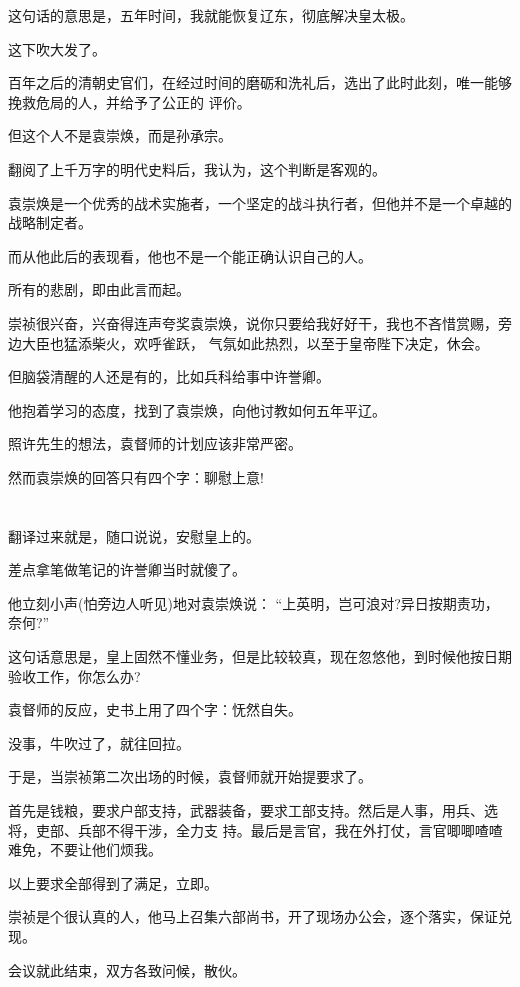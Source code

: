 \documentclass[11pt,a4paper,onecolumn]{article}
\begin{document}
这句话的意思是，五年时间，我就能恢复辽东，彻底解决皇太极。

这下吹大发了。

百年之后的清朝史官们，在经过时间的磨砺和洗礼后，选出了此时此刻，唯一能够挽救危局的人，并给予了公正的
评价。

但这个人不是袁崇焕，而是孙承宗。

翻阅了上千万字的明代史料后，我认为，这个判断是客观的。

袁崇焕是一个优秀的战术实施者，一个坚定的战斗执行者，但他并不是一个卓越的战略制定者。

而从他此后的表现看，他也不是一个能正确认识自己的人。

所有的悲剧，即由此言而起。

崇祯很兴奋，兴奋得连声夸奖袁崇焕，说你只要给我好好干，我也不吝惜赏赐，旁边大臣也猛添柴火，欢呼雀跃，
气氛如此热烈，以至于皇帝陛下决定，休会。

但脑袋清醒的人还是有的，比如兵科给事中许誉卿。

他抱着学习的态度，找到了袁崇焕，向他讨教如何五年平辽。

照许先生的想法，袁督师的计划应该非常严密。

然而袁崇焕的回答只有四个字：聊慰上意!

\section[\thesection]{}

翻译过来就是，随口说说，安慰皇上的。

差点拿笔做笔记的许誉卿当时就傻了。

他立刻小声(怕旁边人听见)地对袁崇焕说： ``上英明，岂可浪对?异日按期责功，奈何?''

这句话意思是，皇上固然不懂业务，但是比较较真，现在忽悠他，到时候他按日期验收工作，你怎么办?

袁督师的反应，史书上用了四个字：怃然自失。

没事，牛吹过了，就往回拉。

于是，当崇祯第二次出场的时候，袁督师就开始提要求了。

首先是钱粮，要求户部支持，武器装备，要求工部支持。然后是人事，用兵、选将，吏部、兵部不得干涉，全力支
持。最后是言官，我在外打仗，言官唧唧喳喳难免，不要让他们烦我。

以上要求全部得到了满足，立即。

崇祯是个很认真的人，他马上召集六部尚书，开了现场办公会，逐个落实，保证兑现。

会议就此结束，双方各致问候，散伙。
\end{document}
